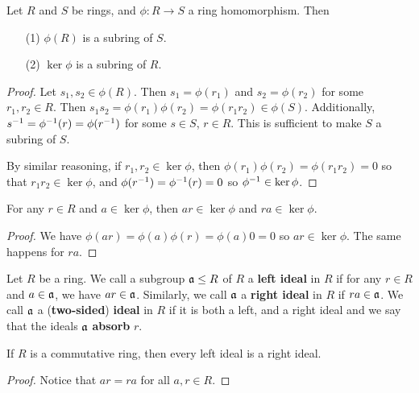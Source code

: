 \begin{proposition}\label{proposition_5.3.1}
  Let $R$ and $S$ be rings, and $\phi:R \xrightarrow{} S$ a ring homomorphism.
  Then
  \begin{enumerate}
    \item[(1)] $\phi(R)$ is a subring of $S$.

    \item[(2)] $\ker{\phi}$ is a subring of $R$.
  \end{enumerate}
\end{proposition}
\begin{proof}
  Let $s_1,s_2 \in \phi(R)$. Then $s_1=\phi(r_1)$ and $s_2=\phi(r_2)$ for some
  $r_1,r_2 \in R$. Then $s_1s_2=\phi(r_1)\phi(r_2)=\phi(r_1r_2) \in \phi(S)$.
  Additionally, $s^{-1}=\phi^{-1}(r)=\phi(r^{-1})$ for some $s \in S$,  $r
  \in R$. This is sufficient to make  $S$ a subring of  $S$.

  By similar reasoning, if $r_1,r_2 \in \ker{\phi}$, then
  $\phi(r_1)\phi(r_2)=\phi(r_1r_2)=0$ so that $r_1r_2 \in \ker{\phi}$, and
  $\phi(r^{-1})=\phi^{-1}(r)=0$ so $\phi^{-1}\in \ker{\phi}$.
\end{proof}
\begin{corollary}
  For any $r \in R$ and  $a \in \ker{\phi}$, then $ar \in \ker{\phi}$ and $ra
  \in \ker{\phi}$.
\end{corollary}
\begin{proof}
  We have $\phi(ar)=\phi(a)\phi(r)=\phi(a)0=0$ so $ar \in \ker{\phi}$. The
  same happens for $ra$.
\end{proof}

\begin{definition}
  Let $R$ be a ring. We call a subgroup $\mathfrak{a} \leq R$ of $R$ a \textbf{left
  ideal} in $R$ if for any $r \in R$ and $a \in \mathfrak{a}$, we have  $ar
  \in \mathfrak{a}$. Similarly, we call  $\mathfrak{a}$ a  \textbf{right ideal} in $R$ if
  $ra \in \mathfrak{a}$. We call  $\mathfrak{a}$ a  (\textbf{two-sided}) \textbf{ideal} in
  $R$ if it is both a left, and a right ideal and we say that the ideals
  $\mathfrak{a}$ \textbf{absorb} $r$.
\end{definition}

\begin{proposition}\label{proposition_5.3.2}
  If $R$ is a commutative ring, then every left ideal is a right ideal.
\end{proposition}
\begin{proof}
  Notice that $ar=ra$ for all  $a,r \in R$.
\end{proof}

